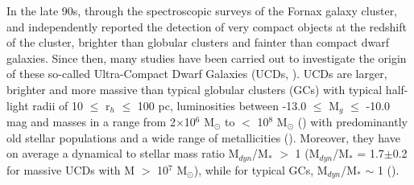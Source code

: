 \documentclass[fleqn,usenatbib]{mnras}
\begin{document}
In the late 90s, through the spectroscopic surveys of the Fornax galaxy cluster, \citet{Hilker-1999} and \citet{Drinkwater-1999} independently reported the detection of very compact objects at the redshift of the cluster, brighter than globular clusters and fainter than compact dwarf galaxies. Since then, many studies have been carried out to investigate the origin of these so-called Ultra-Compact Dwarf Galaxies (UCDs, \citealp{phi2001}). UCDs are larger, brighter and more massive than typical globular clusters (GCs) with typical half-light radii of 10 $\leq$ r$_h$ $\leq$ 100 pc, luminosities between -13.0 $\leq$ M$_g$ $\leq$ -10.0 mag and masses in a range from 2$\times$10$^6$ M$_{\odot}$ to $<$ 10$^8$ M$_{\odot}$ (\citealp{Mieske-2008,Misgeld-2011}) with predominantly old stellar populations and a wide range of metallicities (\citealp{firth2009,janz2016,Zhang-2018,fahrion3,forbes2020}). Moreover, they have on average a dynamical to stellar mass ratio M$_{dyn}$/M$_*$ $>$ 1 (M$_{dyn}$/M$_*$ = 1.7$\pm$0.2 for massive UCDs with M $>$ 10$^7$ M$_\odot$), while for typical GCs, M$_{dyn}$/M$_*$ $\sim$ 1 (\citealp{Mieske-2013}). 
\end{document}
